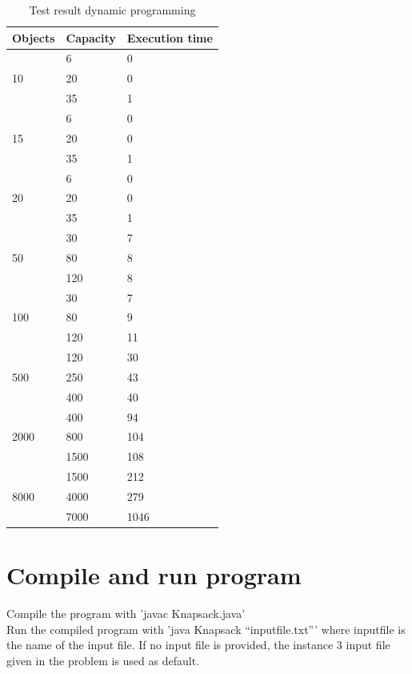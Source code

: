 \documentclass{inc/mas}
\begin{document}
\begin{table}
\begin{center}
\caption{Test result dynamic programming}
\begin{tabular}{|l|l|l|} \hline
Objects &Capacity &Execution time\\ \hline
\multirow{3}{*}{10} & 6 & 0 \\
& 20 & 0 \\
& 35 & 1 \\ \hline
\multirow{3}{*}{15} & 6 & 0 \\
& 20 & 0 \\
& 35 & 1 \\ \hline
\multirow{3}{*}{20} & 6 & 0 \\
& 20 & 0 \\
& 35 & 1 \\ \hline
\multirow{3}{*}{50} & 30 & 7 \\
& 80 & 8 \\
& 120 & 8 \\ \hline
\multirow{3}{*}{100} & 30 & 7 \\
& 80 & 9 \\
& 120 & 11 \\ \hline
\multirow{3}{*}{500} & 120 & 30 \\
& 250 & 43 \\
& 400 & 40 \\ \hline
\multirow{3}{*}{2000} & 400 & 94 \\
& 800 & 104 \\
& 1500 & 108 \\ \hline
\multirow{3}{*}{8000} & 1500 & 212 \\
& 4000 & 279 \\
& 7000 & 1046 \\ \hline
\end{tabular}
\end{center}
\end{table}
\newpage
\appendix
\section{Compile and run program}
\noindent Compile the program with 'javac Knapsack.java'\\ 
\noindent Run the compiled program with 'java Knapsack ``inputfile.txt''' where inputfile is the name of the input file. If no input file is provided, the instance 3 input file given in the problem is used as default. 


\end{document}
